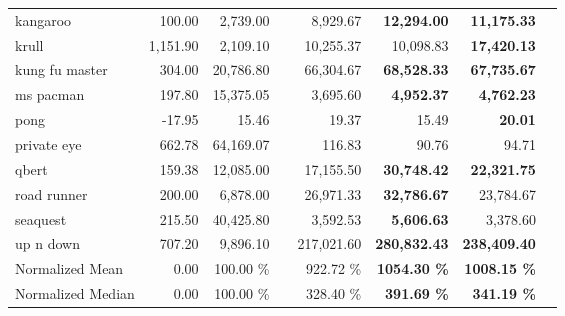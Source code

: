 \begin{table*}[h!t]
{\begin{tabular}{l|rr|rrrrr}
kangaroo & 100.00 & 2,739.00 &&  8,929.67  & \textbf{12,294.00} & \textbf{11,175.33} \\
krull & 1,151.90 & 2,109.10 &&  10,255.37  &  10,098.83  & \textbf{17,420.13} \\
kung fu master & 304.00 & 20,786.80 &&  66,304.67  & \textbf{68,528.33} & \textbf{67,735.67} \\
ms pacman & 197.80 & 15,375.05 &&  3,695.60  & \textbf{4,952.37} & \textbf{4,762.23} \\
pong & -17.95 & 15.46 &&  19.37  &  15.49  & \textbf{20.01} \\
private eye & 662.78 & 64,169.07 &&  116.83  &  90.76  &  94.71  \\
qbert & 159.38 & 12,085.00 &&  17,155.50  & \textbf{30,748.42} & \textbf{22,321.75} \\
road runner & 200.00 & 6,878.00 &&  26,971.33  & \textbf{32,786.67} &  23,784.67  \\
seaquest & 215.50 & 40,425.80 &&  3,592.53  & \textbf{5,606.63} &  3,378.60  \\
up n down & 707.20 & 9,896.10 &&  217,021.60  & \textbf{280,832.43} & \textbf{238,409.40} \\
\midrule                 
Normalized Mean & 0.00 & 100.00 \% &&  922.72 \%  & \textbf{1054.30 \%} & \textbf{1008.15 \%} \\
Normalized Median & 0.00 & 100.00 \% &&  328.40 \%  & \textbf{391.69 \%} & \textbf{341.19 \%} \\
    \bottomrule
    \end{tabular}
}
    \label{tab:Atari26-ablation}
\end{table*}
